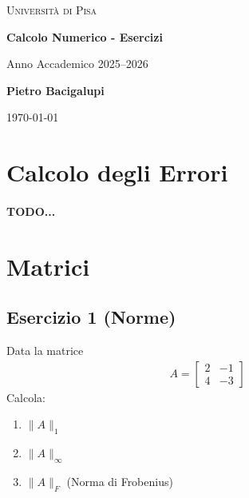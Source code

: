 \documentclass[a4paper,12pt]{article}
\begin{document}
	
	\begin{titlepage}
		\centering
		
		{\scshape\LARGE Università di Pisa \par}
		\vspace{0.5cm}
		
		{\Huge\bfseries Calcolo Numerico - Esercizi \par}
		\vspace{0.5cm}
		{\Large Anno Accademico 2025--2026 \par}
		
		\vfill
		
		{\Large\textbf{Pietro Bacigalupi} \par}
		\vspace{0.5cm}
		
		\vfill
		
		{\large \today\par}
		
	\end{titlepage}
	
	\tableofcontents
	\newpage
	
	\section{Calcolo degli Errori}
	\paragraph{TODO...}
	
	\section{Matrici}
	\subsection{Esercizio 1 (Norme) }
		Data la matrice
		\begin{align*}
			A = \begin{bmatrix}
				2 & -1 \\
				4 & -3
			\end{bmatrix}
		\end{align*}
		Calcola:
		\begin{enumerate}
			\item $\|A\|_1$
			\item $\|A\|_{\infty}$
			\item $\|A\|_F$ (Norma di Frobenius)
		\end{enumerate}
\end{document}
